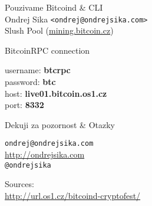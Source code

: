 \documentclass{beamer}
\begin{document}
\begin{frame}

    {\huge Pouzivame Bitcoind \& CLI}\\
    \vspace{7mm}
    {\LARGE Ondrej Sika \lstinline|<ondrej@ondrejsika.com>|}\\
    \vspace{7mm}
    {\Large Slush Pool (\url{mining.bitcoin.cz})}\\

\end{frame}

\begin{frame}

    {\huge BitcoinRPC connection}\\

    \vspace{5mm}

    username: {\bf btcrpc}\\
    password: {\bf btc}\\
    host:     {\bf live01.bitcoin.os1.cz}\\
    port:     {\bf 8332}\\

\end{frame}

\begin{frame}

    {\huge Dekuji za pozornost \& Otazky}\\

    \vspace{1cm}

    \texttt{ondrej@ondrejsika.com}\\
    \url{http://ondrejsika.com}\\
    \texttt{@ondrejsika}\\

    \vspace{1cm}

    Sources:\\
    \url{http://url.os1.cz/bitcoind-cryptofest/}
\end{frame}
\end{document}

